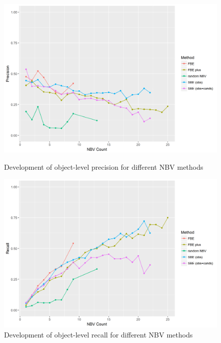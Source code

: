 
\begin{figure}
	\centering
	\begin{minipage}{0.5\linewidth}
		\centering
		\includegraphics[width=0.8\linewidth]{src/Plots/precision_vs_nbv_count_scattered.png}
		\caption{Development of object-level precision for different NBV methods}
	\end{minipage}%
	\begin{minipage}{0.5\linewidth}
		\centering
		\includegraphics[width=0.8\linewidth]{src/Plots/recall_vs_nbv_count_scattered.png}
		\caption{Development of object-level recall for different NBV methods}
	\end{minipage}
\end{figure}

